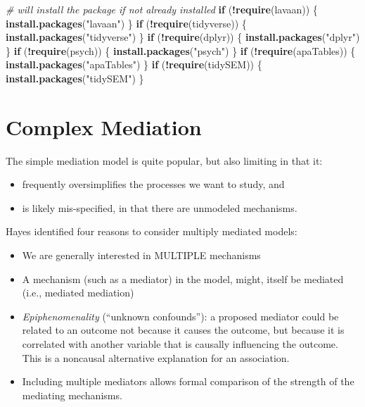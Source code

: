 \documentclass[
  11pt,
]{book}
\newenvironment{Shaded}{\begin{snugshade}}{\end{snugshade}}
\newcommand{\CommentTok}[1]{\textcolor[rgb]{0.37,0.37,0.37}{\textit{#1}}}
\newcommand{\ControlFlowTok}[1]{\textcolor[rgb]{0.27,0.27,0.27}{\textbf{#1}}}
\newcommand{\FunctionTok}[1]{\textcolor[rgb]{0.27,0.27,0.27}{\textbf{#1}}}
\newcommand{\NormalTok}[1]{#1}
\newcommand{\SpecialCharTok}[1]{\textcolor[rgb]{0.43,0.43,0.43}{\textbf{#1}}}
\newcommand{\StringTok}[1]{\textcolor[rgb]{0.5,0.5,0.5}{#1}}
\providecommand{\tightlist}{%
  \setlength{\itemsep}{0pt}\setlength{\parskip}{0pt}}
\begin{document}
\begin{Shaded}
\begin{Highlighting}[]
\CommentTok{\# will install the package if not already installed}
\ControlFlowTok{if}\NormalTok{ (}\SpecialCharTok{!}\FunctionTok{require}\NormalTok{(lavaan)) \{}
    \FunctionTok{install.packages}\NormalTok{(}\StringTok{"lavaan"}\NormalTok{)}
\NormalTok{\}}
\ControlFlowTok{if}\NormalTok{ (}\SpecialCharTok{!}\FunctionTok{require}\NormalTok{(tidyverse)) \{}
    \FunctionTok{install.packages}\NormalTok{(}\StringTok{"tidyverse"}\NormalTok{)}
\NormalTok{\}}
\ControlFlowTok{if}\NormalTok{ (}\SpecialCharTok{!}\FunctionTok{require}\NormalTok{(dplyr)) \{}
    \FunctionTok{install.packages}\NormalTok{(}\StringTok{"dplyr"}\NormalTok{)}
\NormalTok{\}}
\ControlFlowTok{if}\NormalTok{ (}\SpecialCharTok{!}\FunctionTok{require}\NormalTok{(psych)) \{}
    \FunctionTok{install.packages}\NormalTok{(}\StringTok{"psych"}\NormalTok{)}
\NormalTok{\}}
\ControlFlowTok{if}\NormalTok{ (}\SpecialCharTok{!}\FunctionTok{require}\NormalTok{(apaTables)) \{}
    \FunctionTok{install.packages}\NormalTok{(}\StringTok{"apaTables"}\NormalTok{)}
\NormalTok{\}}
\ControlFlowTok{if}\NormalTok{ (}\SpecialCharTok{!}\FunctionTok{require}\NormalTok{(tidySEM)) \{}
    \FunctionTok{install.packages}\NormalTok{(}\StringTok{"tidySEM"}\NormalTok{)}
\NormalTok{\}}
\end{Highlighting}
\end{Shaded}

\hypertarget{complex-mediation}{%
\section{Complex Mediation}\label{complex-mediation}}

The simple mediation model is quite popular, but also limiting in that it:

\begin{itemize}
\tightlist
\item
  frequently oversimplifies the processes we want to study, and
\item
  is likely mis-specified, in that there are unmodeled mechanisms.
\end{itemize}

Hayes \citeyearpar{hayes_more_2022} identified four reasons to consider multiply mediated models:

\begin{itemize}
\tightlist
\item
  We are generally interested in MULTIPLE mechanisms
\item
  A mechanism (such as a mediator) in the model, might, itself be mediated (i.e., mediated mediation)
\item
  \emph{Epiphenomenality} (``unknown confounds''): a proposed mediator could be related to an outcome not because it causes the outcome, but because it is correlated with another variable that is causally influencing the outcome. This is a noncausal alternative explanation for an association.
\item
  Including multiple mediators allows formal comparison of the strength of the mediating mechanisms.
\end{itemize}
\end{document}
